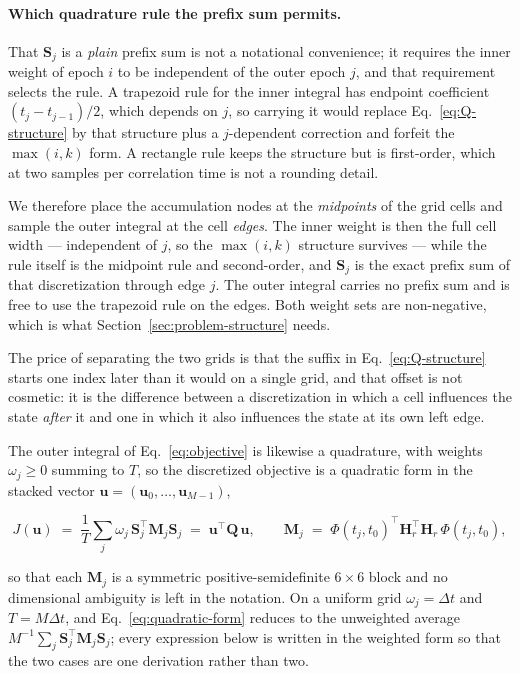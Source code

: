 \paragraph{Which quadrature rule the prefix sum permits.} That
$\mathbf S_j$ is a \emph{plain} prefix sum is not a notational convenience; it
requires the inner weight of epoch $i$ to be independent of the outer epoch
$j$, and that requirement selects the rule. A trapezoid rule for the inner
integral has endpoint coefficient $(t_j-t_{j-1})/2$, which depends on $j$, so
carrying it would replace Eq.~\eqref{eq:Q-structure} by that structure plus a
$j$-dependent correction and forfeit the $\max(i,k)$ form. A rectangle rule
keeps the structure but is first-order, which at two samples per correlation
time is not a rounding detail.

We therefore place the accumulation nodes at the \emph{midpoints} of the grid
cells and sample the outer integral at the cell \emph{edges}. The inner weight
is then the full cell width --- independent of $j$, so the $\max(i,k)$
structure survives --- while the rule itself is the midpoint rule and
second-order, and $\mathbf S_j$ is the exact prefix sum of that
discretization through edge $j$. The outer integral carries no prefix sum and
is free to use the trapezoid rule on the edges. Both weight sets are
non-negative, which is what Section~\ref{sec:problem-structure} needs.

The price of separating the two grids is that the suffix in
Eq.~\eqref{eq:Q-structure} starts one index later than it would on a single
grid, and that offset is not cosmetic: it is the difference between a
discretization in which a cell influences the state \emph{after} it and one in
which it also influences the state at its own left edge.

The outer integral of Eq.~\eqref{eq:objective} is likewise a quadrature, with
weights $\omega_j\ge0$ summing to $T$, so the discretized objective is a
quadratic form in the stacked vector
$\mathbf u=(\mathbf u_0,\dots,\mathbf u_{M-1})$,

\begin{equation}
  J(\mathbf u) \;=\; \frac{1}{T}\sum_{j} \omega_j\,
  \mathbf S_j^{\top}\mathbf M_j\mathbf S_j
  \;=\; \mathbf u^{\top}\mathbf Q\,\mathbf u ,
  \qquad
  \mathbf M_j \;=\; \Phi(t_j,t_0)^{\top}\mathbf H_r^{\top}\mathbf H_r\,
  \Phi(t_j,t_0) ,
  \label{eq:quadratic-form}
\end{equation}

so that each $\mathbf M_j$ is a symmetric positive-semidefinite $6\times6$
block and no dimensional ambiguity is left in the notation. On a uniform grid
$\omega_j=\Delta t$ and $T=M\Delta t$, and Eq.~\eqref{eq:quadratic-form} reduces to
the unweighted average $M^{-1}\sum_j\mathbf S_j^{\top}\mathbf M_j\mathbf S_j$;
every expression below is written in the weighted form so that the two cases
are one derivation rather than two.

